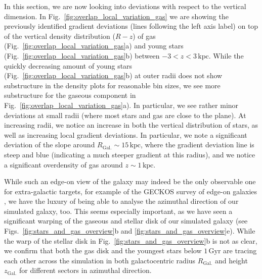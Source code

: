 \documentclass[fleqn,usenatbib]{mnras}
\begin{document}
In this section, we are now looking into deviations with respect to the vertical dimension. In Fig.~\ref{fig:overlap_local_variation_gas} we are showing the previously identified gradient deviations (lines following the left axis label) on top of the vertical density distribution ($R-z$) of gas (Fig.~\ref{fig:overlap_local_variation_gas}a) and young stars (Fig.~\ref{fig:overlap_local_variation_gas}b) between $-3 < z < 3\,\mathrm{kpc}$. While the quickly decreasing amount of young stars (Fig.~\ref{fig:overlap_local_variation_gas}b) at outer radii does not show substructure in the density plots for reasonable bin sizes, we see more substructure for the gaseous component in Fig.~\ref{fig:overlap_local_variation_gas}a). In particular, we see rather minor deviations at small radii (where most stars and gas are close to the plane). At increasing radii, we notice an increase in both the vertical distribution of stars, as well as increasing local gradient deviations. In particular, we note a significant deviation of the slope around $R_\mathrm{Gal.} \sim 15\,\mathrm{kpc}$, where the gradient deviation line is steep and blue (indicating a much steeper gradient at this radius), and we notice a significant overdensity of gas around $z \sim 1\,\mathrm{kpc}$.

While such an edge-on view of the galaxy may indeed be the only observable one for extra-galactic targets, for example of the GECKOS survey of edge-on galaxies \citep{GECKOS2023}, we have the luxury of being able to analyse the azimuthal direction of our simulated galaxy, too. This seems especially important, as we have seen a significant warping of the gaseous and stellar disk of our simulated galaxy (see Figs.~\ref{fig:stars_and_gas_overview}b and \ref{fig:stars_and_gas_overview}e). While the warp of the stellar disk in Fig.~\ref{fig:stars_and_gas_overview}b is not as clear, we confirm that both the gas disk and the youngest stars below $1\,\mathrm{Gyr}$ are tracing each other across the simulation in both galactocentric radius $R_\mathrm{Gal.}$ and height $z_\mathrm{Gal.}$ for different sectors in azimuthal direction.
\end{document}
